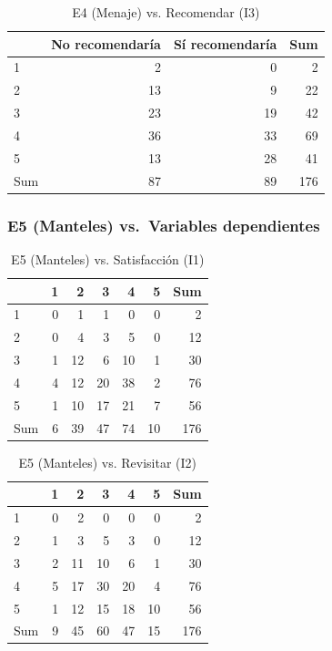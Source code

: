 \documentclass[
  spanish,
]{article}
\begin{document}
\begin{longtable}[t]{lrrr}
\caption{\label{tab:cont-e4-recom}E4 (Menaje) vs. Recomendar (I3)}\\
\toprule
 & No recomendaría & Sí recomendaría & Sum\\
\midrule
1 & 2 & 0 & 2\\
2 & 13 & 9 & 22\\
3 & 23 & 19 & 42\\
4 & 36 & 33 & 69\\
5 & 13 & 28 & 41\\
\addlinespace
Sum & 87 & 89 & 176\\
\bottomrule
\end{longtable}

\subsubsection{E5 (Manteles) vs.~Variables
dependientes}\label{e5-manteles-vs.-variables-dependientes}

\begin{longtable}[t]{lrrrrrr}
\caption{\label{tab:cont-e5-satisf}E5 (Manteles) vs. Satisfacción (I1)}\\
\toprule
 & 1 & 2 & 3 & 4 & 5 & Sum\\
\midrule
1 & 0 & 1 & 1 & 0 & 0 & 2\\
2 & 0 & 4 & 3 & 5 & 0 & 12\\
3 & 1 & 12 & 6 & 10 & 1 & 30\\
4 & 4 & 12 & 20 & 38 & 2 & 76\\
5 & 1 & 10 & 17 & 21 & 7 & 56\\
\addlinespace
Sum & 6 & 39 & 47 & 74 & 10 & 176\\
\bottomrule
\end{longtable}

\begin{longtable}[t]{lrrrrrr}
\caption{\label{tab:cont-e5-revis}E5 (Manteles) vs. Revisitar (I2)}\\
\toprule
 & 1 & 2 & 3 & 4 & 5 & Sum\\
\midrule
1 & 0 & 2 & 0 & 0 & 0 & 2\\
2 & 1 & 3 & 5 & 3 & 0 & 12\\
3 & 2 & 11 & 10 & 6 & 1 & 30\\
4 & 5 & 17 & 30 & 20 & 4 & 76\\
5 & 1 & 12 & 15 & 18 & 10 & 56\\
\addlinespace
Sum & 9 & 45 & 60 & 47 & 15 & 176\\
\bottomrule
\end{longtable}
\end{document}
